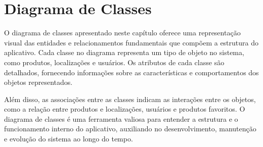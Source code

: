 \chapter{Diagrama de Classes} \label{cha:diagramaclasses}

O diagrama de classes apresentado neste capítulo oferece uma representação visual das entidades e relacionamentos fundamentais que compõem a estrutura do aplicativo. Cada classe no diagrama representa um tipo de objeto no sistema, como produtos, localizações e usuários. Os atributos de cada classe são detalhados, fornecendo informações sobre as características e comportamentos dos objetos representados. 

Além disso, as associações entre as classes indicam as interações entre os objetos, como a relação entre produtos e localizações, usuários e produtos favoritos. O diagrama de classes é uma ferramenta valiosa para entender a estrutura e o funcionamento interno do aplicativo, auxiliando no desenvolvimento, manutenção e evolução do sistema ao longo do tempo.




